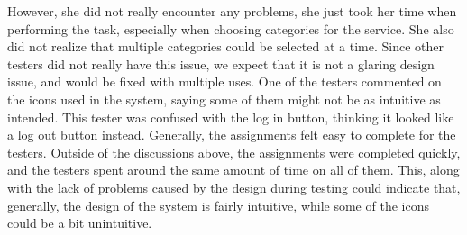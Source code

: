 However, she did not really encounter any problems, she just took her time when performing the task, especially when choosing categories for the service.
She also did not realize that multiple categories could be selected at a time.
Since other testers did not really have this issue, we expect that it is not a glaring design issue, and would be fixed with multiple uses.
One of the testers commented on the icons used in the system, saying some of them might not be as intuitive as intended.
This tester was confused with the log in button, thinking it looked like a log out button instead.
Generally, the assignments felt easy to complete for the testers.
Outside of the discussions above, the assignments were completed quickly, and the testers spent around the same amount of time on all of them.
This, along with the lack of problems caused by the design during testing could indicate that, generally, the design of the system is fairly intuitive, while some of the icons could be a bit unintuitive. 

